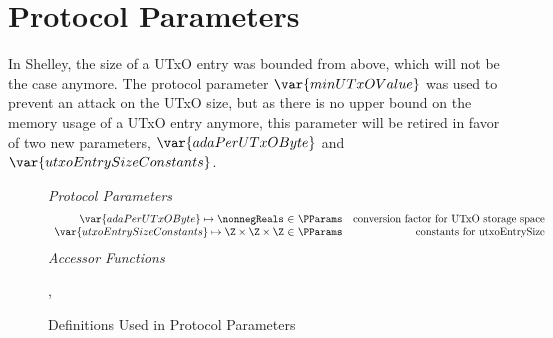 \section{Protocol Parameters}

In Shelley, the size of a UTxO entry was bounded from above, which
will not be the case anymore. The protocol parameter
$\var{minUTxOValue}$ was used to prevent an attack on the UTxO size,
but as there is no upper bound on the memory usage of a UTxO entry
anymore, this parameter will be retired in favor of two new
parameters, $\var{adaPerUTxOByte}$ and $\var{utxoEntrySizeConstants}$.


\begin{figure*}[htb]
  \emph{Protocol Parameters}
  \begin{equation*}
      \begin{array}{r@{~\in~}lr}
        \var{adaPerUTxOByte} \mapsto \nonnegReals & \PParams & \text{conversion factor for UTxO storage space}\\
        \var{utxoEntrySizeConstants} \mapsto \Z \times \Z \times \Z & \PParams & \text{constants for utxoEntrySize}
      \end{array}
  \end{equation*}
  \emph{Accessor Functions}
  \begin{center}
    ,
  \end{center}
  \caption{Definitions Used in Protocol Parameters}
  \label{fig:defs:protocol-parameters}
\end{figure*}

